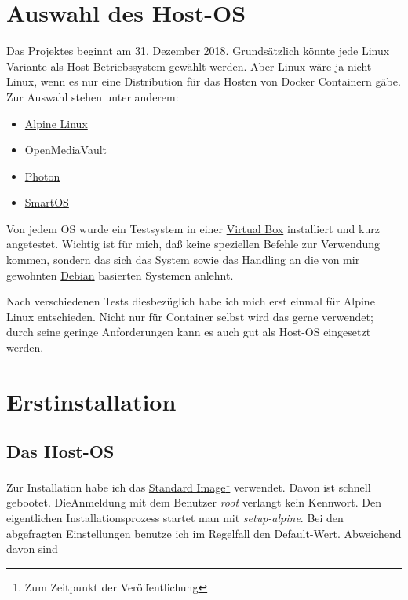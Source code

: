 \documentclass[12pt,a4paper]{article}
\newcommand{\code}[1]{\textit{#1}}
\begin{document}
\section{Auswahl des Host-OS}
Das Projektes beginnt am 31. Dezember 2018. Grundsätzlich könnte jede Linux Variante als Host Betriebssystem gewählt
werden. Aber Linux wäre ja nicht Linux, wenn es nur eine Distribution für das Hosten von Docker Containern gäbe. Zur
Auswahl stehen unter anderem:
\begin{itemize}
	\item \href{https://alpinelinux.org/}{Alpine Linux}
	\item \href{https://www.openmediavault.org/}{OpenMediaVault}
	\item \href{https://vmware.github.io/photon/}{Photon}
	\item \href{https://wiki.smartos.org/display/DOC/Welcome+to+SmartOS}{SmartOS}
\end{itemize}

Von jedem OS wurde ein Testsystem in einer \href{https://www.virtualbox.org/}{Virtual Box} installiert und kurz
angetestet. Wichtig ist für mich, daß keine speziellen Befehle zur Verwendung kommen, sondern das sich das System sowie
das Handling an die von mir gewohnten \href{https://www.debian.org/index.de.html} {Debian} basierten Systemen anlehnt.

Nach verschiedenen Tests diesbezüglich habe ich mich erst einmal für Alpine Linux entschieden. Nicht nur für Container
selbst wird das gerne verwendet; durch seine geringe Anforderungen kann es auch gut als Host-OS eingesetzt werden.

\section{Erstinstallation}
\subsection{Das Host-OS}
Zur Installation habe ich das \href{http://dl-cdn.alpinelinux.org/alpine/v3.8/releases/x86_64/alpine-standard-3.10.2-x86_64.iso}{Standard Image}\footnote{Zum
Zeitpunkt der Veröffentlichung} verwendet. Davon ist schnell gebootet. Die\linebreak Anmeldung mit dem Benutzer \code{root}
verlangt kein Kennwort. Den eigentlichen Installationsprozess startet man mit \code{setup-alpine}. Bei den abgefragten
Einstellungen benutze ich im Regelfall den Default-Wert. Abweichend davon sind
\end{document}
